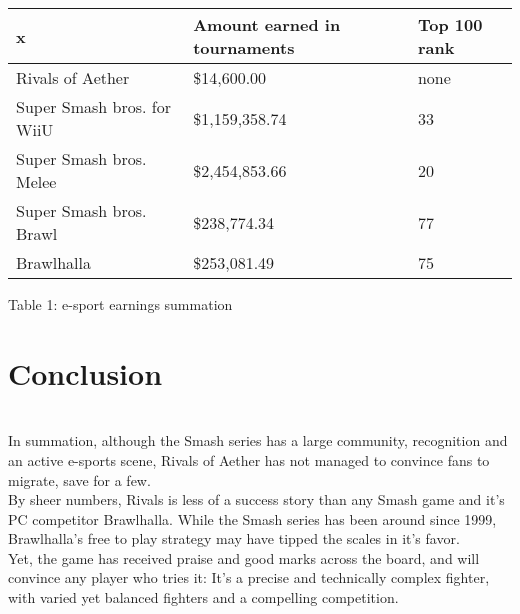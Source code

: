 \documentclass{article}
\begin{document}
\begin{center}
\begin{table}
\begin{tabular}{|l|l|l|}
\hline
x & Amount earned in tournaments & Top 100 rank \\
\hline
Rivals of Aether & \$14,600.00 & none \\
\hline
Super Smash bros. for WiiU & \$1,159,358.74 & 33\\
\hline
Super Smash bros. Melee & \$2,454,853.66 & 20\\
\hline
Super Smash bros. Brawl & \$238,774.34 & 77\\
\hline
Brawlhalla & \$253,081.49 & 75\\
\hline
\end{tabular}
Table 1: e-sport earnings summation\cite{esport:14}\\
\end{table}
\end{center}

\chapter{\textbf{Conclusion}}\\
In summation, although the Smash series has a large community, recognition and an active e-sports scene, Rivals of Aether has not managed to convince fans to migrate, save for a few.\\
By sheer numbers, Rivals is less of a success story than any Smash game and it's PC competitor Brawlhalla. While the Smash series has been around since 1999, Brawlhalla's free to play strategy may have tipped the scales in it's favor.\\

Yet, the game has received praise and good marks across the board, and will convince any player who tries it: It's a precise and technically complex fighter, with varied yet balanced fighters and a compelling competition.\\

\newpage


\end{document}
